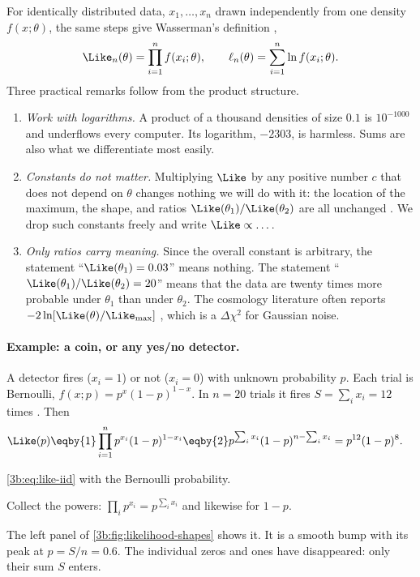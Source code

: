 For identically distributed data, $x_1,\dots,x_n$ drawn independently from
one density $f(x;\theta)$, the same steps give Wasserman's definition
,
\begin{equation}
  \Like_n(\theta)=\prod_{i=1}^n f(x_i;\theta),\qquad
  \ell_n(\theta)=\sum_{i=1}^n\ln f(x_i;\theta).
  \label{3b:eq:like-iid}
\end{equation}
Three practical remarks follow from the product structure.
\begin{enumerate}[label=(\roman*)]
  \item \emph{Work with logarithms.} A product of a thousand densities of
        size $0.1$ is $10^{-1000}$ and underflows every computer. Its
        logarithm, $-2303$, is harmless. Sums are also what we
        differentiate most easily.
  \item \emph{Constants do not matter.} Multiplying $\Like$ by any positive
        number $c$ that does not depend on $\theta$ changes nothing we will
        do with it: the location of the maximum, the shape, and ratios
        $\Like(\theta_1)/\Like(\theta_2)$ are all unchanged
        . We drop such constants freely and write
        $\Like\propto\dots$.
  \item \emph{Only ratios carry meaning.} Since the overall constant is
        arbitrary, the statement ``$\Like(\theta_1)=0.03$'' means nothing.
        The statement ``$\Like(\theta_1)/\Like(\theta_2)=20$'' means that the
        data are twenty times more probable under $\theta_1$ than under
        $\theta_2$. The cosmology literature often reports
        $-2\ln[\Like(\theta)/\Like_{\max}]$ , which is
        a $\Delta\chi^2$ for Gaussian noise.
\end{enumerate}

\paragraph{Example: a coin, or any yes/no detector.}
A detector fires ($x_i=1$) or not ($x_i=0$) with unknown probability $p$.
Each trial is Bernoulli, $f(x;p)=p^x(1-p)^{1-x}$. In $n=20$ trials it
fires $S=\sum_ix_i=12$ times . Then
\begin{align*}
  \Like(p)
  &\eqby{1}\prod_{i=1}^{n}p^{x_i}(1-p)^{1-x_i}
   \eqby{2}p^{\sum_ix_i}(1-p)^{n-\sum_ix_i}
   = p^{12}(1-p)^{8}.
\end{align*}
\begin{explain}
  \item \eqref{3b:eq:like-iid} with the Bernoulli probability.
  \item Collect the powers: $\prod_ip^{x_i}=p^{\sum_ix_i}$ and likewise for
        $1-p$.
\end{explain}
The left panel of \cref{3b:fig:likelihood-shapes} shows it. It is a smooth
bump with its peak at $p=S/n=0.6$. The individual zeros and ones have
disappeared: only their sum $S$ enters.


